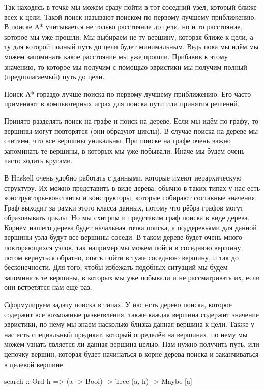 Так находясь в точке  мы можем сразу пойти в тот соседний узел,
который ближе всех к цели. Такой поиск называют поиском по первому
лучшему приближению. В поиске A* учитывается не только расстояние до
цели, но и то расстояние, которое мы уже прошли. Мы выбираем не ту
вершину, которая ближе к цели, а ту для которой полный путь до цели
будет минимальным. Ведь пока мы идём мы можем запоминать какое
расстояние мы уже прошли. Прибавив к этому значению, то которое мы
получим с помощью эвристики мы получим полный (предполагаемый) путь до
цели.

Поиск А* гораздо лучше поиска по первому лучшему приближению. Его часто
применяют в компьютерных играх для поиска пути или принятия решений.

Принято разделять поиск на графе и поиск на дереве. Если мы идём по
графу, то вершины могут повторятся (они образуют циклы). В случае поиска
на дереве мы считаем, что все вершины уникальны. При поиске на графе
очень важно запоминать те вершины, в которых мы уже побывали. Иначе мы
будем очень часто ходить кругами.

В Haskell очень удобно работать с данными, которые имеют иерархическую
структуру. Их можно представить в виде дерева, обычно в таких типах у
нас есть конструкторы-константы и конструкторы, которые собирают
составные значения. Граф выходит за рамки этого класса данных, потому
что рёбра графов могут образовывать циклы. Но мы схитрим и представим
граф поиска в виде дерева. Корнем нашего дерева будет начальная точка
поиска, а поддеревьями для данной вершины узла будут все вершины-соседи.
В таком дереве будет очень много повторяющихся узлов, так например мы
можем пойти в соседнюю вершину, потом вернуться обратно, опять пойти в
туже соседнюю вершину, и так до бесконечности. Для того, чтобы избежать
подобных ситуаций мы будем запоминать те вершины, в которых мы уже
побывали и не рассматривать их, если они встретятся нам ещё раз.

Сформулируем задачу поиска в типах. У нас есть дерево поиска, которое
содержит все возможные разветвления, также каждая вершина содержит
значение эвристики, по нему мы знаем насколько близка данная вершина к
цели. Также у нас есть специальный предикат, который определён на
вершинах, по нему мы можем узнать является ли данная вершина целью. Нам
нужно получить путь, или цепочку вершин, которая будет начинаться в
корне дерева поиска и заканчиваться в целевой вершине.


\begin{code}
search :: Ord h => (a -> Bool) -> Tree (a, h) -> Maybe [a]
\end{code}

